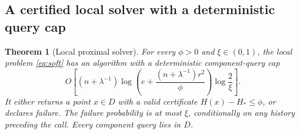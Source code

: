 \documentclass[11pt,a4paper]{article}
\newtheorem{theorem}{Theorem}[section]
\theoremstyle{definition}\newtheorem{definition}[theorem]{Definition}
\theoremstyle{remark}\newtheorem{remark}[theorem]{Remark}
\begin{document}
\subsection{A certified local solver with a deterministic query cap}
\begin{theorem}[Local proximal solver]\label{thm:localsolver}
For every $\phi>0$ and $\xi\in(0,1)$, the local problem \eqref{eq:soft} has an algorithm with a deterministic component-query cap
\begin{equation}\label{eq:localcost}
 O\!\left[
 (n+\lambda^{-1})
 \log\!\left(e+\frac{(n+\lambda^{-1})r^2}{\phi}\right)
 \log\frac{2}{\xi}
 \right].
\end{equation}
It either returns a point $x\in D$ with a valid certificate $H(x)-H_*\le\phi$, or declares failure. The failure probability is at most $\xi$, conditionally on any history preceding the call. Every component query lies in $D$.
\end{theorem}
\end{document}
